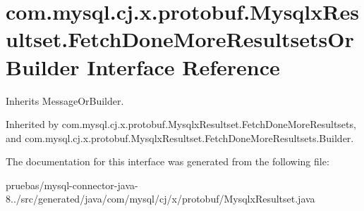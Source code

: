 \hypertarget{interfacecom_1_1mysql_1_1cj_1_1x_1_1protobuf_1_1_mysqlx_resultset_1_1_fetch_done_more_resultsets_or_builder}{}\section{com.\+mysql.\+cj.\+x.\+protobuf.\+Mysqlx\+Resultset.\+Fetch\+Done\+More\+Resultsets\+Or\+Builder Interface Reference}
\label{interfacecom_1_1mysql_1_1cj_1_1x_1_1protobuf_1_1_mysqlx_resultset_1_1_fetch_done_more_resultsets_or_builder}


Inherits Message\+Or\+Builder.



Inherited by com.\+mysql.\+cj.\+x.\+protobuf.\+Mysqlx\+Resultset.\+Fetch\+Done\+More\+Resultsets, and com.\+mysql.\+cj.\+x.\+protobuf.\+Mysqlx\+Resultset.\+Fetch\+Done\+More\+Resultsets.\+Builder.



The documentation for this interface was generated from the following file\+:\begin{DoxyCompactItemize}
\item 
pruebas/mysql-\/connector-\/java-\/8../src/generated/java/com/mysql/cj/x/protobuf/Mysqlx\+Resultset.\+java\end{DoxyCompactItemize}
